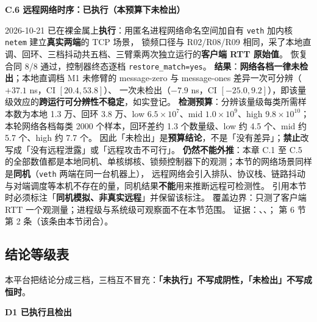 \noindent\textbf{C.6 远程网络时序：已执行（本预算下未检出）}\par
2026-10-21 已在裸金属上\textbf{执行}：用匿名进程网络命名空间加自有 \texttt{veth} 加内核 \texttt{netem} 建立\textbf{真实两端}的 TCP 场景，
锁频口径与 R02/R08/R09 相同，采了本地直调、回环、三档抖动共五档、三臂乘两次独立运行的\textbf{客户端 RTT 原始值}。
恢复合同 8/8 通过，控制器终态逐档 \texttt{restore\_match=yes}。
\textbf{结果}：\textbf{网络各档一律未检出}；本地直调档 M1 未修臂的 message-zero 与 message-ones 差异一次可分辨（$+37.1$ ns，CI $[20.4, 53.8]$）、
一次未检出（$-7.9$ ns，CI $[-25.0, 9.2]$），即该量级效应的\textbf{跨运行可分辨性不稳定}，如实登记。
\textbf{检测预算}：分辨该量级每类所需样本数为本地 1.3 万、回环 3.8 万、low $6.5\times10^{7}$、mid $1.0\times10^{9}$、high $9.8\times10^{10}$；
本轮网络各档每类 2000 个样本，回环差约 1.3 个数量级、low 约 4.5 个、mid 约 5.7 个、high 约 7.7 个。
因此「未检出」是\textbf{预算结论}，不是「没有差异」；\textbf{禁止}改写成「没有远程泄露」或「远程攻击不可行」。
\textbf{仍然不能外推}：本章 C.1 至 C.5 的全部数值都是本地同机、单核绑核、锁频控制器下的观测；本节的网络场景同样是\textbf{同机}（\texttt{veth} 两端在同一台机器上），
远程网络会引入排队、协议栈、链路抖动与对端调度等本机不存在的量，同机结果\textbf{不能}用来推断远程可检测性。
引用本节时必须标注「\textbf{同机模拟、非真实远程}」并保留该标注。
覆盖边界：只测了客户端 RTT 一个观测量；进程级与系统级可观察面不在本节范围。
证据：、、；
 第 6 节第 2 条（该条由本节闭合）。

\subsection{结论等级表}

本平台把结论分成三档，三档互不冒充：\textbf{「未执行」不写成阴性，「未检出」不写成恒时}。

\noindent\textbf{D1 已执行且检出}\par

